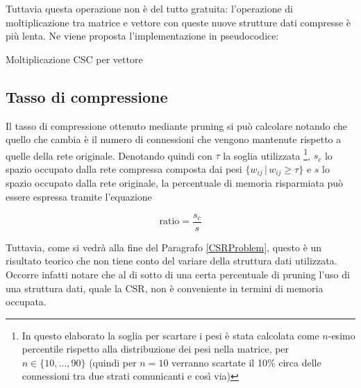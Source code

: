 \documentclass[12pt]{report}
\begin{document}
Tuttavia questa operazione non è del tutto gratuita: l'operazione di moltiplicazione tra matrice e vettore con queste nuove strutture dati compresse è più lenta.
Ne viene proposta l'implementazione in pseudocodice:

\null\par\null

\makeatletter
\def\BState{\State\hskip-\ALG@thistlm}
\makeatother
\begin{algorithm}
\caption{Moltiplicazione CSC per vettore}
\end{algorithm}

\newpage

\subsection{Tasso di compressione}

Il tasso di compressione ottenuto mediante pruning si può calcolare notando che quello che cambia è il numero di connessioni che vengono mantenute rispetto a quelle della rete originale. Denotando quindi con $\tau$ la soglia utilizzata \footnote{In questo elaborato la soglia per scartare i pesi è stata calcolata come $n$-esimo percentile rispetto alla distribuzione dei pesi nella matrice, per $n \in \{10, \dots, 90 \}$ (quindi per $n=10$ verranno scartate il 10\% circa delle connessioni tra due strati comunicanti e così via)}, $s_c$ lo spazio occupato dalla rete compressa composta dai pesi $\lbrace w_{ij} \,|\, w_{ij} \geq \tau \rbrace$ e $s$ lo spazio occupato dalla rete originale, la percentuale di memoria risparmiata può essere espressa tramite l'equazione

\begin{equation}
\mathrm{ratio} = \frac{s_c}{s}
\end{equation}

Tuttavia, come si vedrà alla fine del Paragrafo \ref{CSRProblem}, questo è un risultato teorico che non tiene conto del variare della struttura dati utilizzata. Occorre infatti notare che al di sotto di una certa percentuale di pruning l'uso di una struttura dati, quale la CSR, non è conveniente in termini di memoria occupata.
\end{document}
